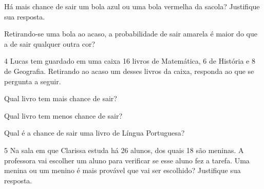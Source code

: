 \begin{mdframed}[linewidth=2pt,linecolor=salmao,roundcorner=2pt]
\begin{escolha}
\begin{escolha}
\item
  Há mais chance de sair um bola azul ou uma bola vermelha da sacola? Justifique sua resposta.


\item
  Retirando-se uma bola ao acaso, a probabilidade de sair amarela é maior do que a de sair qualquer
  outra cor?

\end{escolha}


\num{4} Lucas tem guardado em uma caixa 16 livros de Matemática, 6 de História e
8 de Geografia. Retirando ao acaso um desses livros da caixa, responda ao que se pergunta a seguir.

\begin{escolha}
\item
  Qual livro tem mais chance de sair?


\item
  Qual livro tem menos chance de sair?


\item
  Qual é a chance de sair uma livro de Língua Portuguesa?

\end{escolha}

\num{5} Na sala em que Clarissa estuda há 26 alunos, dos quais 18 são meninas. A
professora vai escolher um aluno para verificar se esse aluno fez a tarefa.
Uma menina ou um menino é mais provável que vai ser escolhido? Justifique sua resposta.

\begin{mdframed}[linewidth=2pt,linecolor=salmao,roundcorner=2pt]



\end{mdframed}


\end{escolha}
\end{mdframed}
